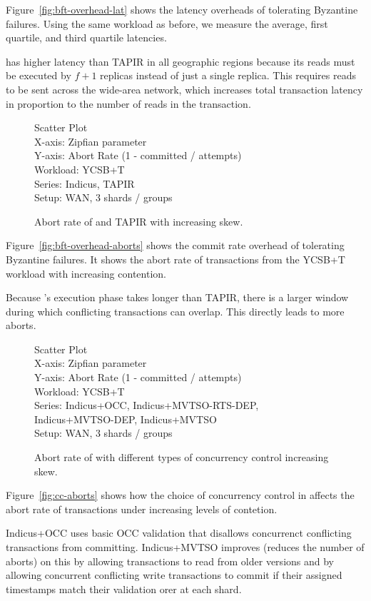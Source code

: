 Figure~\ref{fig:bft-overhead-lat} shows the latency overheads of tolerating
Byzantine failures. Using the same workload as before, we measure the average,
first quartile, and third quartile latencies. 

\sys{} has higher latency than TAPIR in all geographic regions because its
reads must be executed by $f+1$ replicas instead of just a single replica. This
requires reads to be sent across the wide-area network, which increases total
transaction latency in proportion to the number of reads in the transaction.

\begin{figure}
  Scatter Plot\\
  X-axis: Zipfian parameter\\
  Y-axis: Abort Rate (1 - committed / attempts)\\
  Workload: YCSB+T\\
  Series: Indicus, TAPIR\\
  Setup: WAN, 3 shards / groups\\
  \caption{Abort rate of \sys{} and TAPIR with increasing skew.}
\end{figure}

Figure~\ref{fig:bft-overhead-aborts} shows the commit rate overhead of tolerating
Byzantine failures. It shows the abort rate of transactions from the YCSB+T
workload with increasing contention. 

Because \sys{}'s execution phase takes longer than TAPIR, there is a larger
window during which conflicting transactions can overlap. This directly leads
to more aborts.

\begin{figure}
  Scatter Plot\\
  X-axis: Zipfian parameter\\
  Y-axis: Abort Rate (1 - committed / attempts)\\
  Workload: YCSB+T\\
  Series: Indicus+OCC, Indicus+MVTSO-RTS-DEP, Indicus+MVTSO-DEP, Indicus+MVTSO\\
  Setup: WAN, 3 shards / groups\\
  \caption{Abort rate of \sys{} with different types of concurrency control
  increasing skew.}
\end{figure}

Figure~\ref{fig:cc-aborts} shows how the choice of concurrency control in
\sys{} affects the abort rate of transactions under increasing levels of 
contetion.

Indicus+OCC uses basic OCC validation that disallows concurrenct conflicting
transactions from committing. Indicus+MVTSO improves (reduces the number of
aborts) on this by allowing transactions to read from older versions and by
allowing concurrent conflicting write transactions to commit if their assigned
timestamps match their validation orer at each shard.

